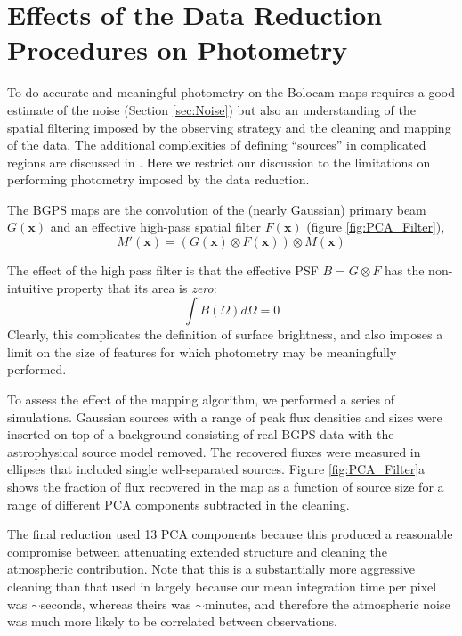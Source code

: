 \documentclass[12pt,preprint]{aastex}
\newcommand{\vect}[1]{\mathbf{#1}}
\newcommand{\xad}{\vect{x}}
\begin{document}
\section{Effects of the Data Reduction Procedures on Photometry}
\label{sec:Photometry}

To do accurate and meaningful photometry on the Bolocam maps requires
a good estimate of the noise (Section \ref{sec:Noise}) but also an
understanding of the spatial filtering imposed by the observing
strategy and the cleaning and mapping of the data.  
The additional
complexities of defining ``sources'' in complicated regions are discussed in
\citet{rosolowsky09}.  Here we restrict our discussion to the limitations
on performing photometry imposed by the data reduction.

The BGPS maps are the convolution of the (nearly Gaussian)
primary beam $G(\xad)$ and an effective high-pass
spatial filter $F(\xad)$ (figure \ref{fig:PCA_Filter}),
\[
M'(\xad) = (G(\xad) \otimes F(\xad)) \otimes M(\xad)
\]

The effect of the high pass filter is that the effective PSF $B=G
\otimes F$ has the non-intuitive property that its area is {\em zero}:
\[
\int{B(\Omega) d\Omega} = 0
\]
Clearly, this complicates the definition of surface brightness, and
also imposes a limit on the size of features for which photometry may
be meaningfully performed.

To assess the effect of the mapping algorithm, we performed a series
of simulations.  Gaussian sources with a range of peak flux densities and sizes
were inserted on top of a background consisting of real BGPS data with the
astrophysical source model removed.  The recovered fluxes were measured in
ellipses that included single well-separated sources.  Figure
\ref{fig:PCA_Filter}a shows the fraction of flux recovered in the map as a
function of source size for a range of different PCA components subtracted in
the cleaning.  


The final reduction used 13 PCA components because this produced a
reasonable compromise between attenuating extended structure and
cleaning the atmospheric contribution.  Note that this is a substantially
more aggressive cleaning than that used in \citet{enoch06} largely because
our mean integration time per pixel was $\sim$seconds, whereas theirs was
$\sim$minutes, and therefore the atmospheric noise was much more likely to
be correlated between observations.
\end{document}
